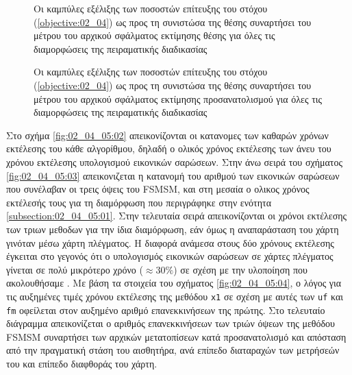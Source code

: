 \begin{figure}[!h]\centering
  \vspace{2cm}
  
  \vspace{1.5cm}
  \caption{\small Οι καμπύλες εξέλιξης των ποσοστών επίτευξης του στόχου
           (\ref{objective:02_04}) ως προς τη συνιστώσα της θέσης
           συναρτήσει του μέτρου του αρχικού σφάλματος εκτίμησης
           θέσης για όλες τις διαμορφώσεις της πειραματικής διαδικασίας}
  \label{fig:02_04_05:11}
\end{figure}


\begin{figure}[!h]\centering
  \vspace{2cm}
  
  \vspace{1.5cm}
  \caption{\small Οι καμπύλες εξέλιξης των ποσοστών επίτευξης του στόχου
           (\ref{objective:02_04}) ως προς τη συνιστώσα της θέσης συναρτήσει του
           μέτρου του αρχικού σφάλματος εκτίμησης προσανατολισμού για όλες τις
           διαμορφώσεις της πειραματικής διαδικασίας}
  \label{fig:02_04_05:12}
\end{figure}

Στο σχήμα \ref{fig:02_04_05:02} απεικονίζονται οι κατανομες των καθαρών χρόνων
εκτέλεσης του κάθε αλγορίθμου, δηλαδή ο ολικός χρόνος εκτέλεσης των άνευ του
χρόνου εκτέλεσης υπολογισμού εικονικών σαρώσεων. Στην άνω σειρά του σχήματος
\ref{fig:02_04_05:03} απεικονιζεται η κατανομή του αριθμού των εικονικών
σαρώσεων που συνέλαβαν οι τρεις όψεις του FSMSM, και στη μεσαία ο ολικος χρόνος
εκτέλεσής τους για τη διαμόρφωση που περιγράφηκε στην ενότητα
\ref{subsection:02_04_05:01}. Στην τελευταία σειρά απεικονίζονται οι χρόνοι
εκτέλεσης των τριων μεθοδων για την ίδια διαμόρφωση, εάν όμως η αναπαράσταση του
χάρτη γινόταν μέσω χάρτη πλέγματος. Η διαφορά ανάμεσα στους δύο χρόνους
εκτέλεσης έγκειται στο γεγονός ότι ο υπολογισμός εικονικών σαρώσεων σε χάρτες
πλέγματος γίνεται σε πολύ μικρότερο χρόνο ($\approx 30\%$) σε σχέση με την
υλοποίηση που ακολουθήσαμε \cite{Walsh2018}. Με βάση τα στοιχεία του σχήματος
\ref{fig:02_04_05:04}, ο λόγος για τις αυξημένες τιμές χρόνου εκτέλεσης της
μεθόδου \texttt{x1} σε σχέση με αυτές των \texttt{uf} και \texttt{fm} οφείλεται
στον αυξημένο αριθμό επανεκκινήσεων της πρώτης. Στο τελευταίο διάγραμμα
απεικονίζεται ο αριθμός επανεκκινήσεων των τριών όψεων της μεθόδου FSMSM
συναρτήσει των αρχικών μετατοπίσεων κατά προσανατολισμό και απόσταση από
την πραγματική στάση του αισθητήρα, ανά επίπεδο διαταραχών των μετρήσεών του
και επίπεδο διαφθοράς του χάρτη.


